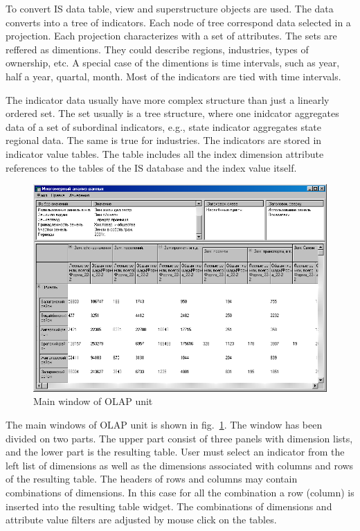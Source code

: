\documentclass[conference]{IEEEtran}
\begin{document}
To convert IS data {table}, {view} and {superstructure} objects are used.  The data converts into a tree of indicators.  Each node of tree correspond data selected in a projection.  Each projection characterizes with a set of attributes.  The sets are reffered as dimentions.  They could describe regions, industries, types of ownership, etc.  A special case of the dimentions is time intervals, such as year, half a year, quartal, month.  Most of the indicators are tied with time intervals.

The indicator data usually have more complex structure than just a linearly ordered set.  The set usually is a tree structure, where one inidcator aggregates data of a set of subordinal indicators, e.g., state indicator aggregates state regional data.  The same is true for industries.  The indicators are stored in indicator value tables.  The table includes all the index dimension attribute references to the tables of the IS database and the index value itself.

\begin{figure}[bt]
  \centering
  \includegraphics[width=\linewidth]{MDA-olap.png}
  \caption{Main window of OLAP unit}
  \label{fig:olapu}
\end{figure}

The main windows of OLAP unit is shown in fig.~\ref{fig:olapu}.  The window has been divided on two parts.  The upper part consist of three panels with dimension lists, and the lower part is the resulting table.  User must select an indicator from the left list of dimensions as well as the dimensions associated with columns and rows of the resulting table.  The headers of rows and columns may contain combinations of dimensions.  In this case for all the combination a row (column) is inserted into the resulting table widget.  The combinations of dimensions and attribute value filters are adjusted by mouse click on the tables.
\end{document}
